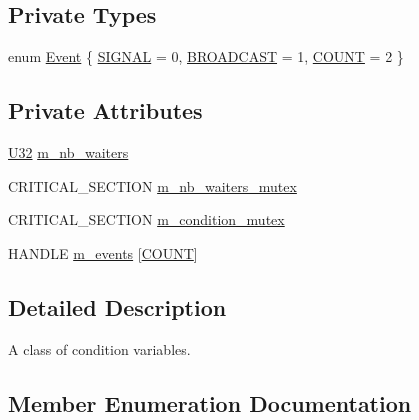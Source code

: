 \subsection*{Private Types}
\begin{DoxyCompactItemize}
\item 
enum \hyperlink{classmage_1_1_condition_variable_ae7627253bf4faebc0aae84a77920d195}{Event} \{ \hyperlink{classmage_1_1_condition_variable_ae7627253bf4faebc0aae84a77920d195a83361ddf52d1973875f7a48ac4bccf94}{S\+I\+G\+N\+AL} = 0, 
\hyperlink{classmage_1_1_condition_variable_ae7627253bf4faebc0aae84a77920d195a5863233d3c1e62ca806753b0d175199f}{B\+R\+O\+A\+D\+C\+A\+ST} = 1, 
\hyperlink{classmage_1_1_condition_variable_ae7627253bf4faebc0aae84a77920d195a553680ab09f088489b7d9f3cef9a5e14}{C\+O\+U\+NT} = 2
 \}
\end{DoxyCompactItemize}
\subsection*{Private Attributes}
\begin{DoxyCompactItemize}
\item 
\hyperlink{namespacemage_a41c104c036fba3756a74e19f793eeaa1}{U32} \hyperlink{classmage_1_1_condition_variable_a1166a25b69eb4b510b551c6c74a13046}{m\+\_\+nb\+\_\+waiters}
\item 
C\+R\+I\+T\+I\+C\+A\+L\+\_\+\+S\+E\+C\+T\+I\+ON \hyperlink{classmage_1_1_condition_variable_a0686e682d62d44ff1eb9ac45acbb0eab}{m\+\_\+nb\+\_\+waiters\+\_\+mutex}
\item 
C\+R\+I\+T\+I\+C\+A\+L\+\_\+\+S\+E\+C\+T\+I\+ON \hyperlink{classmage_1_1_condition_variable_ab5ff870b2881a1979ccaec986d762441}{m\+\_\+condition\+\_\+mutex}
\item 
H\+A\+N\+D\+LE \hyperlink{classmage_1_1_condition_variable_a00691d5e29735da356f577bb5522017d}{m\+\_\+events} \mbox{[}\hyperlink{classmage_1_1_condition_variable_ae7627253bf4faebc0aae84a77920d195a553680ab09f088489b7d9f3cef9a5e14}{C\+O\+U\+NT}\mbox{]}
\end{DoxyCompactItemize}


\subsection{Detailed Description}
A class of condition variables. 

\subsection{Member Enumeration Documentation}
\hypertarget{classmage_1_1_condition_variable_ae7627253bf4faebc0aae84a77920d195}{}\label{classmage_1_1_condition_variable_ae7627253bf4faebc0aae84a77920d195} 
